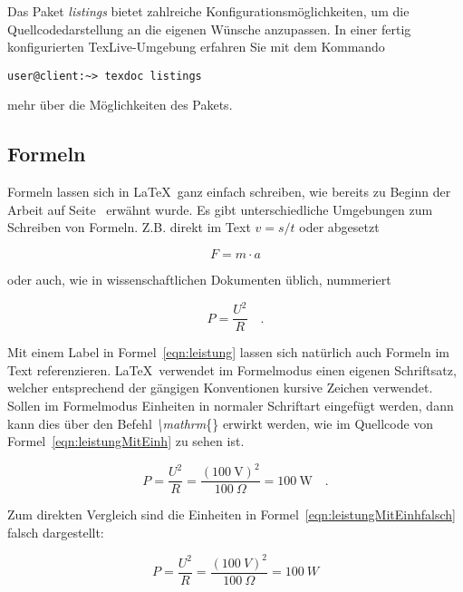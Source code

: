 Das Paket \textit{listings} bietet zahlreiche Konfigurationsmöglichkeiten, um die Quellcodedarstellung an die eigenen Wünsche anzupassen. In einer fertig konfigurierten TexLive-Umgebung erfahren Sie mit dem Kommando

\begin{verbatim}
user@client:~> texdoc listings
\end{verbatim}				%

mehr über die Möglichkeiten des Pakets.


\subsection{Formeln}
\label{sec:formeln}

Formeln lassen sich in \LaTeX~ganz einfach schreiben, wie bereits zu Beginn der Arbeit auf Seite~\pageref{cha:Einleitung} erwähnt wurde. Es gibt unterschiedliche Umgebungen zum Schreiben von Formeln. Z.B. direkt im Text $v=s/t$ oder abgesetzt

\[F=m \cdot a\]

oder auch, wie in wissenschaftlichen Dokumenten üblich, nummeriert

\begin{equation}
P=\frac{U^2}{R} \quad .
\label{eqn:leistung}
\end{equation}

Mit einem Label in Formel~\ref{eqn:leistung} lassen sich natürlich auch Formeln im Text referenzieren. \LaTeX~verwendet im Formelmodus einen eigenen Schriftsatz, welcher entsprechend der gängigen Konventionen kursive Zeichen verwendet. Sollen im Formelmodus Einheiten in normaler Schriftart eingefügt werden, dann kann dies über den Befehl \textit{\textbackslash mathrm}\{\} erwirkt werden, wie im Quellcode von Formel~\ref{eqn:leistungMitEinh} zu sehen ist.

\begin{equation}
P=\frac{U^2}{R} = \frac{\left( 100~\mathrm{V}\right)^2}{100~\Omega} = 100~\mathrm{W}\quad .
\label{eqn:leistungMitEinh}
\end{equation}

Zum direkten Vergleich sind die Einheiten in Formel~\ref{eqn:leistungMitEinhfalsch} falsch dargestellt:

\begin{equation}
P=\frac{U^2}{R} = \frac{\left( 100~V\right)^2}{100~\Omega} = 100~W
\label{eqn:leistungMitEinhfalsch}
\end{equation}


